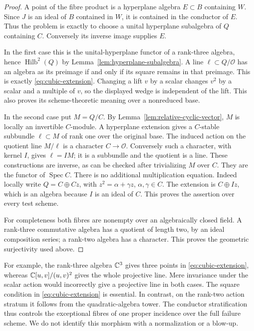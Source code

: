 \begin{proof}
A point of the fibre product is a hyperplane algebra $E\subset B$
containing $W$. Since $J$ is an ideal of $B$ contained in $W$, it
is contained in the conductor of $E$. Thus the problem is exactly
to choose a unital hyperplane subalgebra of $Q$ containing $C$.
Conversely its inverse image supplies $E$.

In the first case this is the unital-hyperplane functor of a
rank-three algebra, hence $\operatorname{Hilb}^2(Q)$ by
Lemma~\ref{lem:hyperplane-subalgebra}. A line $\ell\subset Q/\mathcal O$
has an algebra as its preimage if and only if its square remains
in that preimage. This is exactly \eqref{eq:cubic-extension}.
Changing a lift $v$ by a scalar changes $v^2$ by a scalar and a
multiple of $v$, so the displayed wedge is independent of the lift.
This also proves its scheme-theoretic meaning over a nonreduced base.

In the second case put $M=Q/C$. By
Lemma~\ref{lem:relative-cyclic-vector}, $M$ is locally an invertible
$C$-module. A hyperplane extension gives a $C$-stable subbundle
$\ell\subset M$ of rank one over the original base. The induced
action on the quotient line $M/\ell$ is a character
$C\to\mathcal O$. Conversely such a character, with kernel $I$,
gives $\ell=IM$; it is a subbundle and the quotient is a line.
These constructions are inverse, as can be checked after trivializing
$M$ over $C$. They are the functor of $\operatorname{Spec} C$.
There is no additional multiplication equation. Indeed locally
write $Q=C\oplus Cz$, with $z^2=\alpha+\gamma z$, $\alpha,\gamma\in C$.
The extension is $C\oplus Iz$, which is an algebra because $I$ is
an ideal of $C$. This proves the assertion over every test scheme.

For completeness both fibres are nonempty over an algebraically
closed field. A rank-three commutative algebra has a quotient of
length two, by an ideal composition series; a rank-two algebra has
a character. This proves the geometric surjectivity used above.
\end{proof}

For example, the rank-three algebra $\mathbb C^3$ gives three points in
\eqref{eq:cubic-extension}, whereas $\mathbb C[u,v]/(u,v)^2$ gives the
whole projective line. Mere invariance under the scalar action
would incorrectly give a projective line in both cases. The square
condition in \eqref{eq:cubic-extension} is essential. In contrast,
on the rank-two action stratum it follows from the quadratic-algebra
tower. The conductor stratification thus controls the exceptional
fibres of one proper incidence over the full failure scheme.
We do not identify this morphism with a normalization or a blow-up.

